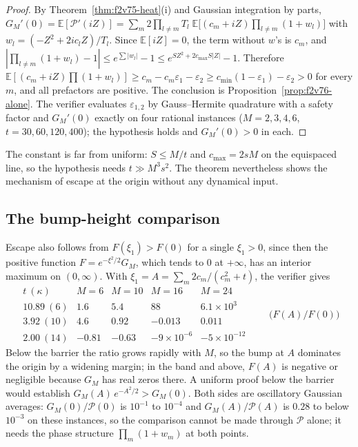 \documentclass[11pt]{article}
\theoremstyle{definition}
\theoremstyle{remark}
\begin{document}
\begin{proof}
By Theorem~\ref{thm:f2v75-heat}(i) and Gaussian integration by parts,
\(G_M'(0)=\mathbb E[\mathcal P'(iZ)]=\sum_m2\prod_{l\ne m}T_l\;
\mathbb E\bigl[(c_m+iZ)\prod_{l\ne m}(1+w_l)\bigr]\) with
\(w_l=(-Z^2+2ic_lZ)/T_l\).  Since \(\mathbb E[iZ]=0\), the term without
\(w\)'s is \(c_m\), and
\(|\prod_{l\ne m}(1+w_l)-1|\le e^{\sum|w_l|}-1\le e^{SZ^2+2c_{\max}S|Z|}-1\).
Therefore
\(\mathbb E[(c_m+iZ)\prod(1+w_l)]\ge c_m-c_m\varepsilon_1-\varepsilon_2
\ge c_{\min}(1-\varepsilon_1)-\varepsilon_2>0\) for every \(m\), and
all prefactors are positive.  The conclusion is
Proposition~\ref{prop:f2v76-alone}.  The verifier evaluates
\(\varepsilon_{1,2}\) by Gauss--Hermite quadrature with a safety factor
and \(G_M'(0)\) exactly on four rational instances (\(M=2,3,4,6\),
\(t=30,60,120,400\)); the hypothesis holds and \(G_M'(0)>0\) in each.
\end{proof}

The constant is far from uniform: \(S\le M/t\) and \(c_{\max}=2sM\) on
the equispaced line, so the hypothesis needs \(t\gg M^3s^2\).  The
theorem nevertheless shows the mechanism of escape at the origin without
any dynamical input.

\subsection{The bump-height comparison}

Escape also follows from \(F(\xi_1)>F(0)\) for a single \(\xi_1>0\),
since then the positive function \(F=e^{-\xi^2/2}G_M\), which tends to
\(0\) at \(+\infty\), has an interior maximum on \((0,\infty)\).  With
\(\xi_1=A=\sum_m2c_m/(c_m^2+t)\), the verifier gives
\begin{equation}
\begin{array}{c|cccc}
 t\ (\kappa) & M=6 & M=10 & M=16 & M=24\\ \hline
 10.89\ (6) & 1.6 & 5.4 & 88 & 6.1\times10^3\\
 3.92\ (10) & 4.6 & 0.92 & -0.013 & 0.011\\
 2.00\ (14) & -0.81 & -0.63 & -9\times10^{-6} & -5\times10^{-12}
\end{array}
\qquad\bigl(F(A)/F(0)\bigr)
\label{eq:f2v79-ratio}
\end{equation}
Below the barrier the ratio grows rapidly with \(M\), so the bump at
\(A\) dominates the origin by a widening margin; in the band and above,
\(F(A)\) is negative or negligible because \(G_M\) has real zeros
there.  A uniform proof below the barrier would establish
\(G_M(A)\,e^{-A^2/2}>G_M(0)\).  Both sides are oscillatory Gaussian
averages: \(G_M(0)/\mathcal P(0)\) is \(10^{-1}\) to \(10^{-4}\) and
\(G_M(A)/\mathcal P(A)\) is \(0.28\) to below \(10^{-3}\) on these
instances, so the comparison cannot be made through \(\mathcal P\) alone;
it needs the phase structure \(\prod_m(1+w_m)\) at both points.
\end{document}
